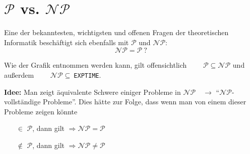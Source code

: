 \documentclass{scrartcl}%
\begin{document}

    \section*{$\mathcal{P}$ vs. $\mathcal{N}\mathcal{P}$}

    \begin{figure}[H]
        \centering
    \end{figure}

    Eine der bekanntesten, wichtigsten und offenen Fragen der theoretischen Informatik beschäftigt sich ebenfalls mit $\mathcal{P}$ und $\mathcal{N}\mathcal{P}$:
    \begin{equation*}
        \mathcal{N}\mathcal{P} = \mathcal{P}\ ?
    \end{equation*}

    Wie der Grafik entnommen werden kann, gilt offensichtlich $\qquad \mathcal{P} \subseteq \mathcal{N}\mathcal{P}$ \newline und außerdem $\qquad \mathcal{N}\mathcal{P} \subseteq\ $\texttt{EXPTIME}.

    \vspace*{0.3cm}
    \textbf{\textsf{Idee:}} Man zeigt äquivalente Schwere einiger Probleme in $\mathcal{N}\mathcal{P} \quad \rightarrow$ "`$\mathcal{N}\mathcal{P}$-vollständige Probleme"'.
    Dies hätte zur Folge, dass wenn man von einem dieser Probleme zeigen könnte
    \begin{itemize}
        \item [$\in$]$\mathcal{P}$, dann gilt $\Rightarrow \mathcal{N}\mathcal{P} = \mathcal{P}$
        \item [$\notin$]$\mathcal{P}$, dann gilt $\Rightarrow \mathcal{N}\mathcal{P} \neq \mathcal{P}$
    \end{itemize}
\end{document}
